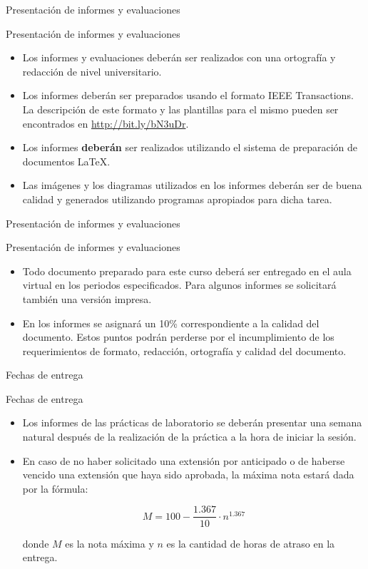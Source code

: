 \documentclass[handout,xcolor=dvipsnames]{beamer}
\begin{document}
\begin{frame}{Presentación de informes y evaluaciones}
\begin{block}{Presentación de informes y evaluaciones}
  \begin{itemize}[<+->]
    \item Los informes y evaluaciones deberán ser realizados con una ortografía y redacción de nivel universitario.
    \item Los informes deberán ser preparados usando el formato IEEE Transactions. La descripción de este formato y las plantillas para el mismo pueden ser encontrados en \url{http://bit.ly/bN3uDr}.
    \item Los informes \textbf{deberán} ser realizados utilizando el sistema de preparación de documentos \LaTeX.
    \item Las imágenes y los diagramas utilizados en los informes deberán ser de buena calidad y generados utilizando programas apropiados para dicha tarea.
  \end{itemize}
\end{block}
\end{frame}


\begin{frame}{Presentación de informes y evaluaciones}
\begin{block}{Presentación de informes y evaluaciones}
  \begin{itemize}[<+->]
    \item Todo documento preparado para este curso deberá ser entregado en el aula virtual en los periodos especificados. Para algunos informes se solicitará también una versión impresa.
    \item En los informes se asignará un 10\% correspondiente a la calidad del documento. Estos puntos podrán perderse por el incumplimiento de los requerimientos de formato, redacción, ortografía y calidad del documento.
  \end{itemize}
\end{block}
\end{frame}

\begin{frame}{Fechas de entrega}
\begin{block}{Fechas de entrega}
  \begin{itemize}[<+->]
    \item Los informes de las prácticas de laboratorio se deberán presentar una semana natural después de la realización de la práctica a la hora de iniciar la sesión.
    \item En caso de no haber solicitado una extensión por anticipado o de haberse vencido una extensión que haya sido aprobada, la máxima nota estará dada por la fórmula:

      \[ M = 100-\frac{1.367}{10}\cdot n^{1.367} \]

    donde $M$ es la nota máxima y $n$ es la cantidad de horas de atraso en la entrega. 
  \end{itemize}
\end{block}
\end{frame}
\end{document}
